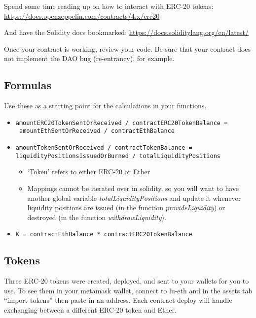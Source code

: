 \documentclass[10pt]{article}
\begin{document}
Spend some time reading up on how to interact with ERC-20 tokens: \url{https://docs.openzeppelin.com/contracts/4.x/erc20}

And have the Solidity docs bookmarked: \url{https://docs.soliditylang.org/en/latest/}

Once your contract is working, review your code.  Be sure that your contract does not implement the DAO bug (re-entrancy), for example.

\subsection{Formulas}
Use these as a starting point for the calculations in your functions.
\begin{itemize}
\item
\begin{verbatim}
amountERC20TokenSentOrReceived / contractERC20TokenBalance =
 amountEthSentOrReceived / contractEthBalance
\end{verbatim}
\item
\begin{verbatim}
amountTokenSentOrReceived / contractTokenBalance = 
liquidityPositionsIssuedOrBurned / totalLiquidityPositions
\end{verbatim}

\begin{itemize}
    \item ‘Token’ refers to either ERC-20 or Ether
    \item Mappings cannot be iterated over in solidity, so you will want to have another global variable {\it totalLiquidityPositions} and update it whenever liquidity positions are issued (in the function {\it provideLiquidity}) or destroyed (in the function {\it withdrawLiquidity}).
\end{itemize}

\item
\begin{verbatim}
K = contractEthBalance * contractERC20TokenBalance
\end{verbatim}
\end{itemize}

\subsection{Tokens}
Three ERC-20 tokens were created, deployed, and sent to your wallets for you to use.  To see them in your metamask wallet, connect to lu-eth and in the assets tab “import tokens” then paste in an address.
Each contract deploy will handle exchanging between a different ERC-20 token and Ether.
\end{document}
